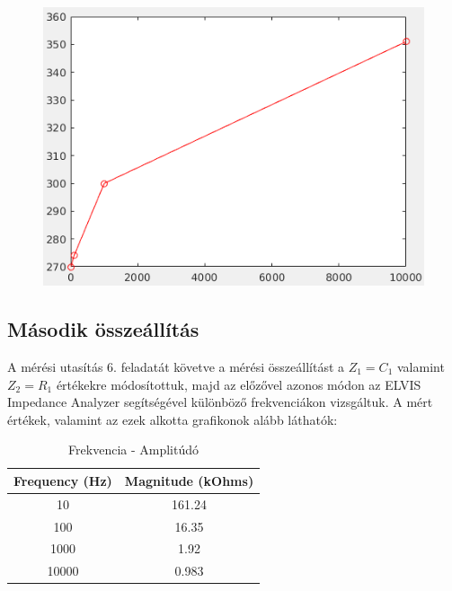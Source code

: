 \documentclass[10pt, conference,a4paper]{ITKproc}
\begin{document}
\begin{figure}[h]
\includegraphics[scale=0.3]{1_f_p}
\centering

\end{figure}

\subsection{Második összeállítás}

A mérési utasítás 6. feladatát követve a mérési összeállítást a $Z_1 = C_1$ valamint $Z_2 = R_1$ értékekre módosítottuk, majd az előzővel azonos módon az ELVIS Impedance Analyzer segítségével különböző frekvenciákon vizsgáltuk. A mért értékek, valamint az ezek alkotta grafikonok alább láthatók: 

\begin{table}[ht!]
\renewcommand{\arraystretch}{1.3}
\caption{Frekvencia - Amplitúdó}
\centering
\begin{tabular}{c||c}
\hline
\bfseries Frequency (Hz) & \bfseries Magnitude (kOhms) \\
\hline\hline
 10 & 161.24\\
\hline
 100 & 16.35\\
\hline
1000 & 1.92\\
\hline
10000 & 0.983\\
\hline
\end{tabular}
\end{table}
\end{document}
